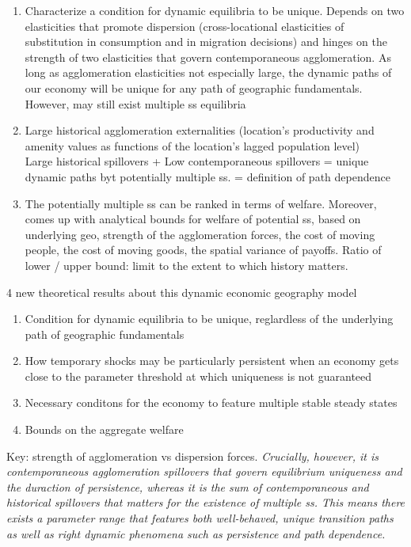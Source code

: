 \documentclass[10pt, final]{article}
\begin{document}
\begin{enumerate}[1.]
    \item Characterize a condition for dynamic equilibria to be unique. Depends on two elasticities that promote dispersion (cross-locational elasticities of substitution in consumption and in migration decisions) and hinges on the strength of two elasticities that govern contemporaneous agglomeration. 
    As long as agglomeration elasticities not especially large, the dynamic paths of our economy will be unique for any path of geographic fundamentals. However, may still exist multiple ss equilibria
    \item Large historical agglomeration externalities (location's productivity and amenity values as functions of the location's lagged population level)\\
    Large historical spillovers + Low contemporaneous spillovers = unique dynamic paths byt potentially multiple ss. = definition of path dependence
    \item The potentially multiple ss can be ranked in terms of welfare. Moreover, comes up with analytical bounds for welfare of potential ss, based on underlying geo, strength of the agglomeration forces, the cost of moving people, the cost of moving goods, the spatial variance of payoffs. Ratio of lower / upper bound: limit to the extent to which history matters.
\end{enumerate}
4 new theoretical results about this dynamic economic geography model
\begin{enumerate}
    \item Condition for dynamic equilibria to be unique, reglardless of the underlying path of geographic fundamentals
    \item How temporary shocks may be particularly persistent when an economy gets close to the parameter threshold at which uniqueness is not guaranteed
    \item Necessary conditons for the economy to feature multiple stable steady states
    \item Bounds on the aggregate welfare
\end{enumerate}
Key: strength of agglomeration vs dispersion forces. \textit{Crucially, however, it is contemporaneous agglomeration spillovers that govern equilibrium uniqueness and the duraction of persistence, whereas it is the sum of contemporaneous and historical spillovers that matters for the existence of multiple ss. This means there exists a parameter range that features both well-behaved, unique transition paths as well as right dynamic phenomena such as persistence and path dependence.}
\end{document}
